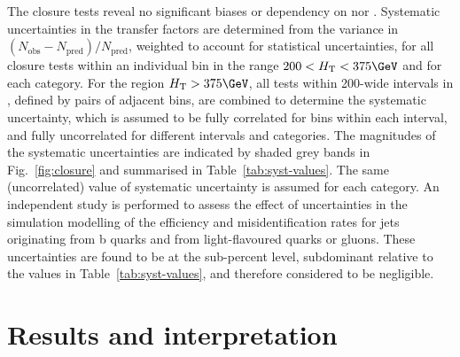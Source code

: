 The closure tests reveal no significant biases or dependency on \njet
nor \scalht. Systematic uncertainties in the transfer factors are
determined from the variance in $(N_\text{obs} -
N_\text{pred})/N_\text{pred}$, weighted to account for statistical
uncertainties, for all closure tests within an individual \scalht bin
in the range $200 < \scalht < 375\GeV$ and for each \njet
category. For the region $\scalht > 375\GeV$, all tests within
200\GeV-wide intervals in \scalht, defined by pairs of adjacent bins,
are combined to determine the systematic uncertainty, which is assumed
to be fully correlated for bins within each interval, and fully
uncorrelated for different \scalht intervals and \njet categories. The
magnitudes of the systematic uncertainties are indicated by shaded
grey bands in Fig.~\ref{fig:closure} and summarised in
Table~\ref{tab:syst-values}. The same (uncorrelated) value of
systematic uncertainty is assumed for each \nb category. An
independent study is performed to assess the effect of uncertainties
in the simulation modelling of the efficiency and misidentification
rates for jets originating from b quarks and from light-flavoured
quarks or gluons. These uncertainties are found to be at the
sub-percent level, subdominant relative to the values in
Table~\ref{tab:syst-values}, and therefore considered to be
negligible.

\section{Results and interpretation\label{sec:results}}

